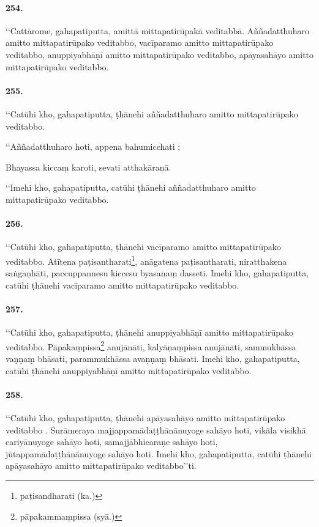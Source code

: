 \paragraph{254.} ‘‘Cattārome, gahapatiputta, amittā mittapatirūpakā veditabbā. Aññadatthuharo amitto mittapatirūpako veditabbo, vacīparamo amitto mittapatirūpako veditabbo, anuppiyabhāṇī amitto mittapatirūpako veditabbo, apāyasahāyo amitto mittapatirūpako veditabbo.

\paragraph{255.} ‘‘Catūhi kho, gahapatiputta, ṭhānehi aññadatthuharo amitto mittapatirūpako veditabbo.

‘‘Aññadatthuharo hoti, appena bahumicchati ;

Bhayassa kiccaṃ karoti, sevati atthakāraṇā.

‘‘Imehi kho, gahapatiputta, catūhi ṭhānehi aññadatthuharo amitto mittapatirūpako veditabbo.

\paragraph{256.} ‘‘Catūhi kho, gahapatiputta, ṭhānehi vacīparamo amitto mittapatirūpako veditabbo. Atītena paṭisantharati\footnote{paṭisandharati (ka.)}, anāgatena paṭisantharati, niratthakena saṅgaṇhāti, paccuppannesu kiccesu byasanaṃ dasseti. Imehi kho, gahapatiputta, catūhi ṭhānehi vacīparamo amitto mittapatirūpako veditabbo.

\paragraph{257.} ‘‘Catūhi kho, gahapatiputta, ṭhānehi anuppiyabhāṇī amitto mittapatirūpako veditabbo. Pāpakaṃpissa\footnote{pāpakammaṃpissa (syā.)} anujānāti, kalyāṇaṃpissa anujānāti, sammukhāssa vaṇṇaṃ bhāsati, parammukhāssa avaṇṇaṃ bhāsati. Imehi kho, gahapatiputta, catūhi ṭhānehi anuppiyabhāṇī amitto mittapatirūpako veditabbo.

\paragraph{258.} ‘‘Catūhi kho, gahapatiputta, ṭhānehi apāyasahāyo amitto mittapatirūpako veditabbo . Surāmeraya majjappamādaṭṭhānānuyoge sahāyo hoti, vikāla visikhā cariyānuyoge sahāyo hoti, samajjābhicaraṇe sahāyo hoti, jūtappamādaṭṭhānānuyoge sahāyo hoti. Imehi kho, gahapatiputta, catūhi ṭhānehi apāyasahāyo amitto mittapatirūpako veditabbo’’ti.

